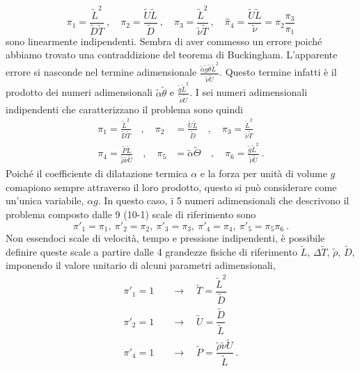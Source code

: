 \begin{equation}
    \pi_1 = \frac{\tilde{L}^2}{\tilde{D}\tilde{T}} \ , \quad
    \pi_2 = \frac{\tilde{U}\tilde{L}}{\tilde{D}} \ , \quad
    \pi_3 = \frac{\tilde{L}^2}{\tilde{\nu}\tilde{T}} \ , \quad 
    \hat{\pi}_4 = \frac{\tilde{U}\tilde{L}}{\tilde{\nu}} = \pi_2 \dfrac{\pi_3}{\pi_1}
\end{equation}
sono linearmente indipendenti. Sembra di aver commesso un errore poiché abbiamo trovato una contraddizione del teorema di Buckingham. L'apparente errore si nasconde nel termine adimensionale $\frac{\tilde{\alpha} \tilde{g} \tilde{\theta} \tilde{L}^2}{\tilde{\nu} \tilde{U}}$. Questo termine infatti è il prodotto dei numeri adimensionali $\tilde{\alpha} \tilde{\theta}$ e $\frac{\tilde{g} \tilde{L}^2}{\tilde{\nu} \tilde{U}}$.
I sei numeri adimensionali indipendenti che caratterizzano il problema sono quindi
\begin{equation}
\begin{aligned}
    \pi_1 = \frac{\tilde{L}^2}{\tilde{D}\tilde{T}} \quad ,\quad
    \pi_2 & = \frac{\tilde{U}\tilde{L}}{\tilde{D}} \quad ,\quad
    \pi_3 = \frac{\tilde{L}^2}{\tilde{\nu}\tilde{T}} \\
    \pi_4 = \frac{\tilde{P}\tilde{L}}{\tilde{\rho}\tilde{\nu}\tilde{U}} \quad ,\quad
    \pi_5 & = {\tilde{\alpha}\tilde{\Theta}} \quad ,\quad
    \pi_6 = \frac{\tilde{g} \tilde{L}^2}{\tilde{\nu} \tilde{U}} \ .
\end{aligned}
\end{equation}
%
Poiché il coefficiente di dilatazione termica $\alpha$ e la forza per unità di volume $g$ comapiono sempre attraverso il loro prodotto, questo si può considerare come un'unica variabile, $\alpha g$. In questo caso, i 5 numeri adimensionali che descrivono il problema composto dalle 9 (10-1) scale di riferimento sono
\begin{equation}
  \pi'_1 = \pi_1, \  \pi'_2 = \pi_2, \ \pi'_3 = \pi_3, \ \pi'_4 = \pi_4, \ \pi'_5 = \pi_5 \pi_6 \ .  
\end{equation}
%
Non essendoci scale di velocità, tempo e pressione indipendenti, è possibile definire queste scale a partire dalle 4 grandezze fisiche di riferimento $\tilde{L}$, $\Delta \tilde{T}$, $\tilde{\rho}$, $\tilde{D}$, imponendo il valore unitario di alcuni parametri adimensionali,
\begin{equation}
    \begin{aligned}
      \pi'_1 = 1 & \quad \rightarrow \quad \tilde{T} = \dfrac{\tilde{L}^2}{\tilde{D}} \\
      \pi'_2 = 1 & \quad \rightarrow \quad \tilde{U} = \dfrac{\tilde{D}}{\tilde{L}} \\
      \pi'_4 = 1 & \quad \rightarrow \quad \tilde{P} = \dfrac{\tilde{\rho}\tilde{\nu}\tilde{U}}{\tilde{L}} \ .
    \end{aligned}
\end{equation}

